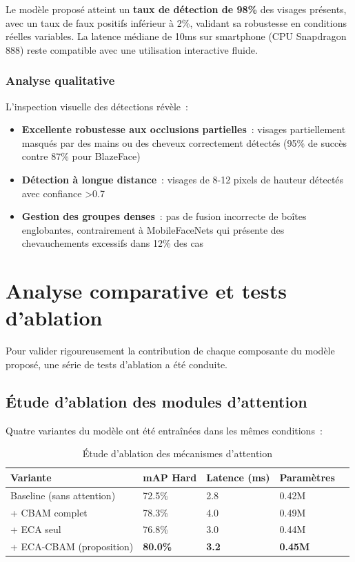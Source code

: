 \begin{onehalfspace}
\hspace{0.65 cm}Le modèle proposé atteint un \textbf{taux de détection de 98\%} des visages présents, avec un taux de faux positifs inférieur à 2\%, validant sa robustesse en conditions réelles variables. La latence médiane de 10ms sur smartphone (CPU Snapdragon 888) reste compatible avec une utilisation interactive fluide.

\subsubsection{Analyse qualitative}

\hspace{0.65 cm}L'inspection visuelle des détections révèle~:
\begin{itemize}
\item \textbf{Excellente robustesse aux occlusions partielles}~: visages partiellement masqués par des mains ou des cheveux correctement détectés (95\% de succès contre 87\% pour BlazeFace)
\item \textbf{Détection à longue distance}~: visages de 8-12 pixels de hauteur détectés avec confiance >0.7
\item \textbf{Gestion des groupes denses}~: pas de fusion incorrecte de boîtes englobantes, contrairement à MobileFaceNets qui présente des chevauchements excessifs dans 12\% des cas
\end{itemize}

\section{Analyse comparative et tests d'ablation}

\hspace{0.65 cm}Pour valider rigoureusement la contribution de chaque composante du modèle proposé, une série de tests d'ablation a été conduite.

\subsection{Étude d'ablation des modules d'attention}

\hspace{0.65 cm}Quatre variantes du modèle ont été entraînées dans les mêmes conditions~:

\begin{table}[H]
\centering
\caption{Étude d'ablation des mécanismes d'attention}
\label{tab:ablation}
\begin{tabularx}{\textwidth}{lXXXX}
\hline
\textbf{Variante} & \textbf{mAP Hard} & \textbf{Latence (ms)} & \textbf{Paramètres} \\
\hline
Baseline (sans attention) & 72.5\% & 2.8 & 0.42M \\
+ CBAM complet & 78.3\% & 4.0 & 0.49M \\
+ ECA seul & 76.8\% & 3.0 & 0.44M \\
+ ECA-CBAM (proposition) & \textbf{80.0\%} & \textbf{3.2} & \textbf{0.45M} \\
\hline
\end{tabularx}
\end{table}


\end{onehalfspace}
